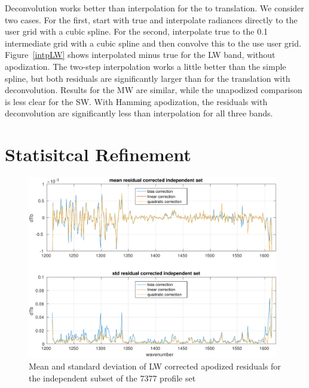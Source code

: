 \documentclass[12pt]{article}
\begin{document}
Deconvolution works better than interpolation for the {\airs} to
{\cris} translation.  We consider two cases.  For the first, start
with true {\airs} and interpolate radiances directly to the {\cris}
user grid with a cubic spline.  For the second, interpolate true
{\airs} to the 0.1 {\wn} intermediate grid with a cubic spline and
then convolve this to the use {\cris} user grid.  Figure~\ref{intpLW}
shows interpolated {\cris} minus true {\cris} for the LW band,
without apodization.  The two-step interpolation works a little
better than the simple spline, but both residuals are significantly
larger than for the translation with deconvolution.  Results for the
MW are similar, while the unapodized comparison is less clear for the
SW.  With Hamming apodization, the residuals with deconvolution are
significantly less than interpolation for all three bands.

\FloatBarrier
\section{Statisitcal Refinement}
\label{statfix}

\begin{figure} %
  \centering
  \includegraphics[height=8cm]{figures/a2cris_stat_LW.pdf}
  \caption{Mean and standard deviation of LW corrected apodized
    residuals for the independent subset of the 7377 profile set}
  \label{statLW}
\end{figure}
\end{document}
